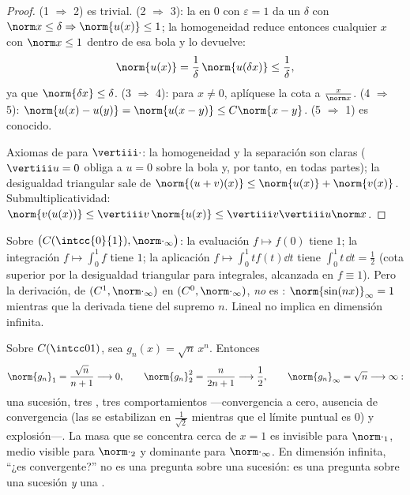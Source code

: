 \begin{proof}
(1 $\Rightarrow$ 2) es trivial. (2 $\Rightarrow$ 3): la 
en $0$ con $\varepsilon = 1$ da un $\delta$ con $\norm x \leq \delta
\Rightarrow \norm{u(x)} \leq 1$; la homogeneidad reduce entonces
cualquier $x$ con $\norm x \leq 1$ dentro de esa bola y lo devuelve:
\[
\norm{u(x)} = \frac1\delta\,\norm{u(\delta x)} \leq
\frac1\delta ,
\]
ya que $\norm{\delta x} \leq \delta$. (3 $\Rightarrow$ 4): para $x
\neq 0$, aplíquese la cota a $\frac{x}{\norm x}$. (4 $\Rightarrow$
5): $\norm{u(x) - u(y)} = \norm{u(x - y)} \leq C\norm{x - y}$. (5
$\Rightarrow$ 1) es conocido.

Axiomas de  para $\vertiii\cdot$: la homogeneidad y la
separación son claras ($\vertiii u = 0$ obliga a $u = 0$ sobre la
bola y, por tanto, en todas partes); la desigualdad triangular sale
de $\norm{(u + v)(x)} \leq \norm{u(x)} + \norm{v(x)}$.
Submultiplicatividad: $\norm{v(u(x))} \leq \vertiii v\,\norm{u(x)}
\leq \vertiii v \vertiii u \norm x$.
\end{proof}

\begin{example}\label{ex:b2:nvs:operatornorms}
Sobre $\bigl(C(\intcc{0}{1}), \norm\cdot_\infty\bigr)$: la
evaluación $f \mapsto f(0)$ tiene  $1$; la
integración $f \mapsto \int_0^1 f$ tiene  $1$; la aplicación
$f \mapsto \int_0^1 t f(t)\dd t$ tiene  $\int_0^1 t\,\dd t =
\frac12$ (cota superior por la desigualdad triangular para
integrales, alcanzada en $f \equiv 1$). Pero la derivación, de
$(C^1, \norm\cdot_\infty)$ en $(C^0, \norm\cdot_\infty)$, \emph{no}
es : $\norm{\sin(nx)}_\infty = 1$ mientras que la derivada
tiene  del supremo $n$. Lineal no implica  en
dimensión infinita.
\end{example}

\begin{example}\label{ex:b2:nvs:sqrtnxn}
Sobre $C(\intcc01)$, sea $g_n(x) = \sqrt{n}\,x^n$. Entonces
\[
\norm{g_n}_1 = \frac{\sqrt n}{n + 1} \longrightarrow 0,
\qquad
\norm{g_n}_2^2 = \frac{n}{2n + 1} \longrightarrow \frac12,
\qquad
\norm{g_n}_\infty = \sqrt n \longrightarrow \infty :
\]
una sucesión, tres , tres comportamientos ---convergencia a
cero, ausencia de convergencia (las  se estabilizan en
$\frac1{\sqrt2}$ mientras que el límite puntual es $0$) y
explosión---. La masa que se concentra cerca de $x = 1$ es
invisible para $\norm\cdot_1$, medio visible para $\norm\cdot_2$ y
dominante para $\norm\cdot_\infty$. En dimensión infinita, ``¿es
convergente?'' no es una pregunta sobre una sucesión: es una
pregunta sobre una sucesión \emph{y} una .
\end{example}

